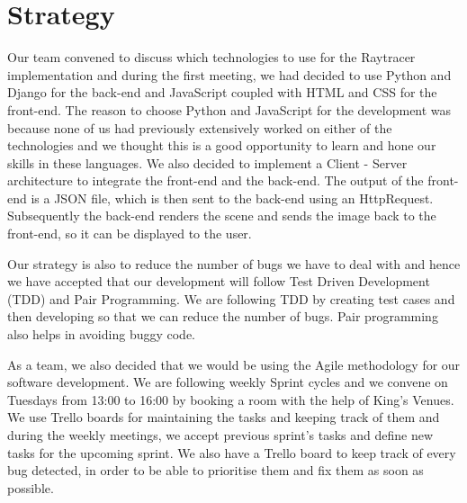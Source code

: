 \documentclass[10pt]{scrartcl}
\begin{document}
\section{Strategy}
Our team convened to discuss which technologies to use for the Raytracer implementation and during the first meeting, we had decided to use Python and Django for the back-end and JavaScript coupled with HTML and CSS for the front-end. The reason to choose Python and JavaScript for the development was because none of us had previously extensively worked on either of the technologies and we thought this is a good opportunity to learn and hone our skills in these languages. We also decided to implement a Client - Server architecture to integrate the front-end and the back-end. The output of the front-end is a JSON file, which is then sent to the back-end using an HttpRequest. Subsequently the back-end renders the scene and sends the image back to the front-end, so it can be displayed to the user.\par
Our strategy is also to reduce the number of bugs we have to deal with and hence we have accepted that our development will follow Test Driven Development (TDD) and Pair Programming. We are following TDD by creating test cases and then developing so that we can reduce the number of bugs. Pair programming also helps in avoiding buggy code. \par
As a team, we also decided that we would be using the Agile methodology for our software development. We are following weekly Sprint cycles and we convene on Tuesdays from 13:00 to 16:00 by booking a room with the help of King's Venues.
We use Trello boards for maintaining the tasks and keeping track of them and during the weekly meetings, we accept previous sprint's tasks and define new tasks for the upcoming sprint. We also have a Trello board to keep track of every bug detected, in order to be able to prioritise them and fix them as soon as possible.
\end{document}
